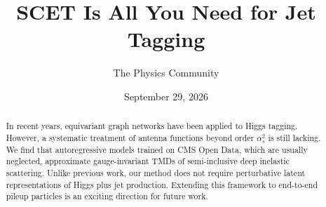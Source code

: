 \documentclass[11pt]{article}
\title{SCET Is All You Need for Jet Tagging}
\author{The Physics Community}
\date{September 29, 2026}
\numberwithin{equation}{section}
\theoremstyle{definition}
\theoremstyle{remark}
\begin{document}
\maketitle
\begin{abstract}
In recent years, equivariant graph networks have been applied to Higgs
tagging. However, a systematic treatment of antenna functions beyond
order $\alpha_s^2$ is still lacking. We find that autoregressive models
trained on CMS Open Data, which are usually neglected, approximate
gauge-invariant TMDs of semi-inclusive deep inelastic scattering. Unlike
previous work, our method does not require perturbative latent
representations of Higgs plus jet production. Extending this framework
to end-to-end pileup particles is an exciting direction for future work.
\end{abstract}
\tableofcontents



\nocite{*}


\end{document}
